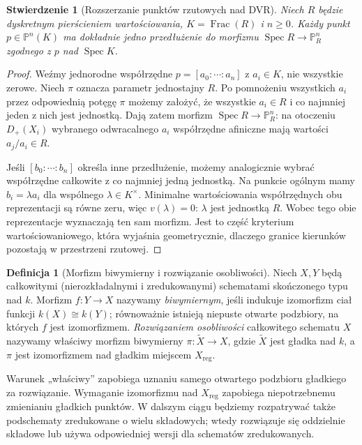 \documentclass[11pt,a4paper,openany]{report}
\numberwithin{equation}{section}
\theoremstyle{plain}
\newtheorem{stwierdzenie}[twierdzenie]{Stwierdzenie}
\theoremstyle{definition}
\newtheorem{definicja}[twierdzenie]{Definicja}
\theoremstyle{remark}
\newcommand{\PP}{\mathbb P}
\newcommand{\Spec}{\operatorname{Spec}}
\newcommand{\Frac}{\operatorname{Frac}}
\begin{document}
\begin{stwierdzenie}[Rozszerzanie punktów rzutowych nad DVR]
\label{st:ga5-valuative-projective}
Niech $R$ będzie dyskretnym pierścieniem wartościowania,
$K=\Frac(R)$ i $n\ge0$. Każdy punkt $p\in\PP^n(K)$
ma dokładnie jedno przedłużenie do morfizmu
$\Spec R\to\PP^n_R$ zgodnego z $p$ nad $\Spec K$.
\end{stwierdzenie}
\begin{proof}
Weźmy jednorodne współrzędne $p=[a_0:\cdots:a_n]$
z $a_i\in K$, nie wszystkie zerowe. Niech $\pi$ oznacza
parametr jednostajny $R$. Po pomnożeniu wszystkich
$a_i$ przez odpowiednią potęgę $\pi$ możemy założyć,
że wszystkie $a_i\in R$ i co najmniej jeden z nich jest
jednostką. Dają zatem morfizm $\Spec R\to\PP^n_R$:
na otoczeniu $D_+(X_i)$ wybranego odwracalnego $a_i$
współrzędne afiniczne mają wartości $a_j/a_i\in R$.

Jeśli $[b_0:\cdots:b_n]$ określa inne przedłużenie,
możemy analogicznie wybrać współrzędne całkowite z
co najmniej jedną jednostką. Na punkcie ogólnym mamy
$b_i=\lambda a_i$ dla wspólnego $\lambda\in K^\times$.
Minimalne wartościowania współrzędnych obu reprezentacji
są równe zeru, więc $v(\lambda)=0$: $\lambda$ jest
jednostką $R$. Wobec tego obie reprezentacje wyznaczają
ten sam morfizm. Jest to część kryterium wartościowaniowego,
która wyjaśnia geometrycznie, dlaczego granice kierunków
pozostają w przestrzeni rzutowej.
\end{proof}

\begin{definicja}[Morfizm biwymierny i rozwiązanie osobliwości]
\label{def:ga5-resolution}
Niech $X,Y$ będą całkowitymi (nierozkładalnymi i zredukowanymi)
schematami skończonego typu nad $k$. Morfizm $f:Y\to X$
nazywamy \emph{biwymiernym}, jeśli indukuje izomorfizm ciał
funkcji $k(X)\cong k(Y)$; równoważnie istnieją niepuste
otwarte podzbiory, na których $f$ jest izomorfizmem.
\emph{Rozwiązaniem osobliwości} całkowitego schematu $X$
nazywamy właściwy morfizm biwymierny $\pi:\widetilde X\to X$,
gdzie $\widetilde X$ jest gładka nad $k$, a $\pi$ jest
izomorfizmem nad gładkim miejscem $X_{\mathrm{reg}}$.
\end{definicja}

Warunek „właściwy” zapobiega uznaniu samego otwartego
podzbioru gładkiego za rozwiązanie. Wymaganie izomorfizmu
nad $X_{\mathrm{reg}}$ zapobiega niepotrzebnemu zmienianiu
gładkich punktów. W dalszym ciągu będziemy rozpatrywać
także podschematy zredukowane o wielu składowych;
wtedy rozwiązuje się oddzielnie składowe lub używa
odpowiedniej wersji dla schematów zredukowanych.
\end{document}
